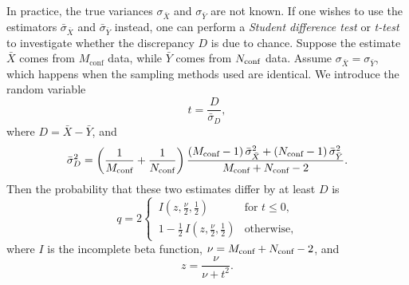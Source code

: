 In practice, the true variances $\sigma_{\bar{X}}$ and $\sigma_{\bar{Y}}$
are not known. If one wishes to use the estimators $\bar{\sigma}_{\bar{X}}$
and $\bar{\sigma}_{\bar{Y}}$ instead, one can perform a {\it Student
difference test} or {\it t-test} to investigate whether the 
discrepancy $D$ is due to chance. Suppose the estimate $\bar{X}$ comes from 
$M_{\text{conf}}$ data, while $\bar{Y}$ comes from $N_{\text{conf}}$ data.
Assume $\sigma_{\bar{X}}=\sigma_{\bar{Y}}$, which
happens when the sampling methods used are identical.
We introduce the random variable
\begin{equation}
  t=\frac{D}{\bar{\sigma}_D},
\end{equation}
where $D=\bar{X}-\bar{Y}$, and
\begin{equation}
  \bar{\sigma}^2_D=\left(\frac{1}{M_{\text{conf}}}+\frac{1}{N_{\text{conf}}}\right)
                   \frac{(M_{\text{conf}}-1)\,\bar{\sigma}_{\bar{X}}^2
                    +(N_{\text{conf}}-1)\,\bar{\sigma}_{\bar{Y}}^2}
                   {M_{\text{conf}}+N_{\text{conf}}-2}.
\end{equation}
Then the probability that these two estimates differ by at least $D$ is
\begin{equation}
 q=2
 \begin{cases}
 \,I\left(z,\frac{\nu}{2},\frac{1}{2}\right) & \text{for }t\leq 0, \\
 \,1-\frac{1}{2}\,I\left(z,\frac{\nu}{2},\frac{1}{2}\right) & \text{otherwise},
 \end{cases}
\end{equation}
where $I$ is the incomplete beta function, $\nu=M_{\text{conf}}+N_{\text{conf}}-2$,
and
\begin{equation}
  z=\frac{\nu}{\nu+t^2}.
\end{equation}

